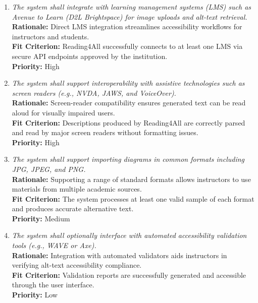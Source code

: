 \documentclass[12pt]{article}
\begin{document}
\begin{enumerate}[label=OER-IAS\arabic*., wide=0pt, leftmargin=*]
  \item \emph{The system shall integrate with learning management
      systems (LMS) such as Avenue to Learn (D2L Brightspace) for image
    uploads and alt-text retrieval.}\\[2mm]
    {\bf Rationale:} Direct LMS integration streamlines accessibility
    workflows for instructors and students.\\
    {\bf Fit Criterion:} Reading4All successfully connects to at
    least one LMS via secure API endpoints approved by the institution.\\
    {\bf Priority:} High

  \item \emph{The system shall support interoperability with
      assistive technologies such as screen readers (e.g., NVDA, JAWS,
    and VoiceOver).}\\[2mm]
    {\bf Rationale:} Screen-reader compatibility ensures generated
    text can be read aloud for visually impaired users.\\
    {\bf Fit Criterion:} Descriptions produced by Reading4All are
    correctly parsed and read by major screen readers without
    formatting issues.\\
    {\bf Priority:} High

  \item \emph{The system shall support importing diagrams in common
    formats including JPG, JPEG, and PNG.}\\[2mm]
    {\bf Rationale:} Supporting a range of standard formats allows
    instructors to use materials from multiple academic sources.\\
    {\bf Fit Criterion:} The system processes at least one valid
    sample of each format and produces accurate alternative text.\\
    {\bf Priority:} Medium

  \item \emph{The system shall optionally interface with automated
    accessibility validation tools (e.g., WAVE or Axe).}\\[2mm]
    {\bf Rationale:} Integration with automated validators aids
    instructors in verifying alt-text accessibility compliance.\\
    {\bf Fit Criterion:} Validation reports are successfully
    generated and accessible through the user interface.\\
    {\bf Priority:} Low
\end{enumerate}
\end{document}
